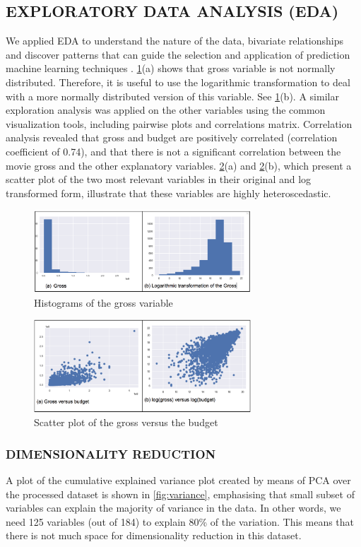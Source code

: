 \subsection{EXPLORATORY DATA ANALYSIS (EDA)}
We applied EDA to understand the nature of the data, bivariate relationships and discover patterns that can guide the selection and application of prediction machine learning techniques \cite{behrens1997principles}. \figurename{} \ref{fig:hist}(a) shows that gross variable is not normally distributed. Therefore, it is useful to use the logarithmic transformation to deal with a more normally distributed version of this variable. See \figurename{} \ref{fig:hist}(b). A similar exploration analysis was applied on the other variables using the common visualization tools, including pairwise plots and correlations matrix. Correlation analysis revealed that gross and budget are positively correlated (correlation coefficient of 0.74), and that there is not a significant correlation between the movie gross and the other explanatory variables. \figurename{} \ref{fig:scatter}(a) and \figurename{} \ref{fig:scatter}(b), which present a scatter plot of the two most relevant variables in their original and log transformed form, illustrate that these variables are highly heteroscedastic. 
\begin{figure}[h]
\centering
\includegraphics[width=3.2in]{figures/hist}
\caption{Histograms of the gross variable} 
\label{fig:hist}
\end{figure}
\begin{figure}[h]
\centering
\includegraphics[width=3.2in]{figures/scatter}
\caption{Scatter plot of the gross versus the budget} 
\label{fig:scatter}
\end{figure}

\subsubsection{DIMENSIONALITY REDUCTION}
A plot of the cumulative explained variance plot created by means of PCA over the processed dataset is shown in \figurename{} \ref{fig:variance}, emphasising that small subset of variables can explain the majority of variance in the data. In other words, we need 125 variables (out of 184) to explain 80\% of the variation. This means that there is not much space for dimensionality reduction in this dataset.

